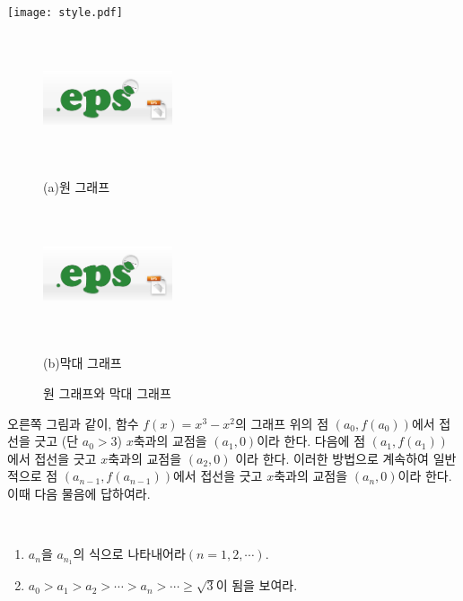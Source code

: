 \documentclass[11pt]{article}
\begin{document}
\texttt{[image: style.pdf]}

\begin{figure}[!t]
\noindent
\begin{minipage}[t]{2.5in}
\centerline{\includegraphics[width=1.5in, height=1.5in]{eps.png}}
\centerline{(a)원 그래프}
\end{minipage} \hfill
\begin{minipage}[t]{2.5in}
\centerline{\includegraphics[width=1.5in, height=1.5in]{eps.png}}
\centerline{(b)막대 그래프}
\end{minipage}
\caption{원 그래프와 막대 그래프 \label{fig:hist}}
\end{figure}

\begin{minipage}[c]{2.1in}
오른쪽 그림과 같이, 함수 $f(x)=x^3-x^2$의 그래프 위의 점 $(a_0, f(a_0))$에서 접선을 긋고 (단 $a_0>3$) $x$축과의 교점을 $(a_1, 0)$이라 한다. 다음에 점 $(a_1, f(a_1))$에서 접선을 긋고 $x$축과의 교점을 $(a_2, 0)$ 이라 한다. 이러한 방법으로 계속하여 일반적으로 점 $(a_{n-1},f(a_{n-1}))$에서 접선을 긋고 $x$축과의 교점을 $(a_n, 0)$이라 한다. 이때 다음 물음에 답하여라.
\end{minipage}
\  \hfill \
\begin{enumerate}
\item $a_n$을 $a_{n_1}$의 식으로 나타내어라$(n=1,2,\cdots)$.
\item $a_0>a_1>a_2>\cdots>a_n>\cdots \geq \sqrt{3}$이 됨을 보여라.
\end{enumerate}
\end{document}
